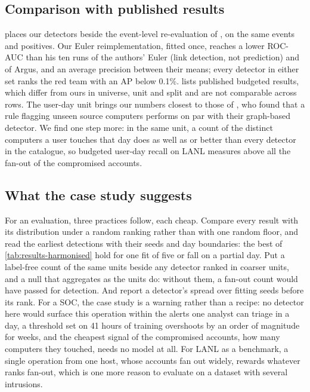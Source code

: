\documentclass[11pt,a4paper]{article}
\begin{document}
\subsection{Comparison with published results}
\label{sec:comparison}
 places our detectors beside the event-level re-evaluation of \textcite{larroche2026fair}, on the same \HarmUniverseEvents{} events and \HarmTestPositives{} positives. Our Euler reimplementation, fitted once, reaches a lower ROC-AUC than his ten runs of the authors' Euler (link detection, not prediction) and of Argus, and an average precision between their means; every detector in either set ranks the red team with an AP below 0.1\%.  lists published budgeted results, which differ from ours in universe, unit and split and are not comparable across rows. The user-day unit brings our numbers closest to those of \textcite{garchery2020adsage}, who found that a rule flagging unseen source computers performs on par with their graph-based detector. We find one step more: in the same unit, a count of the distinct computers a user touches that day does as well as or better than every detector in the catalogue, so budgeted user-day recall on LANL measures above all the fan-out of the compromised accounts.

\subsection{What the case study suggests}
For an evaluation, three practices follow, each cheap. Compare every result with its distribution under a random ranking rather than with one random floor, and read the earliest detections with their seeds and day boundaries: the best of \cref{tab:results-harmonised} hold for one fit of five or fall on a partial day. Put a label-free count of the same units beside any detector ranked in coarser units, and a null that aggregates as the units do: without them, a fan-out count would have passed for detection. And report a detector's spread over fitting seeds before its rank. For a SOC, the case study is a warning rather than a recipe: no detector here would surface this operation within the alerts one analyst can triage in a day, a threshold set on 41 hours of training overshoots by an order of magnitude for weeks, and the cheapest signal of the compromised accounts, how many computers they touched, needs no model at all. For LANL as a benchmark, a single operation from one host, whose accounts fan out widely, rewards whatever ranks fan-out, which is one more reason to evaluate on a dataset with several intrusions.
\end{document}
